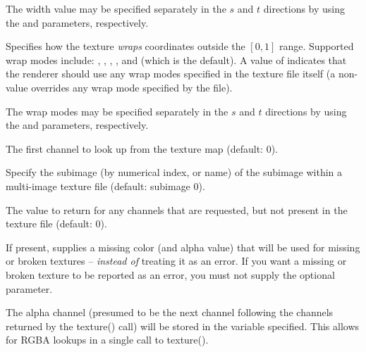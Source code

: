 \documentclass[11pt,letterpaper]{book}
\begin{document}
The width value may be specified separately in the $s$ and $t$
directions by using the  and  parameters,
respectively.
\apiend
\vspace{-16pt}

\vspace{12pt}

Specifies how the texture \emph{wraps} coordinates outside the $[0,1]$
range.  Supported wrap modes include: , ,
, , and  (which is the default).  A
value of  indicates that the renderer should use any wrap
modes specified in the texture file itself (a non- value
overrides any wrap mode specified by the file).

The wrap modes may be specified separately in the $s$ and $t$ directions
by using the  and  parameters, respectively.
\apiend
\vspace{-16pt}

\vspace{12pt}
The first channel to look up from the texture map (default: 0).
\apiend
\vspace{-16pt}

\vspace{12pt}
Specify the subimage (by numerical index, or name) of the subimage
within a multi-image texture file (default: subimage 0).
\apiend
\vspace{-16pt}

\vspace{12pt}
The value to return for any channels that are requested,
but not present in the texture file (default: 0).
\apiend
\vspace{-16pt}

\vspace{12pt}
If present, supplies a missing color (and alpha value) that will
be used for missing or broken textures -- \emph{instead of} treating
it as an error.  If you want a missing or broken texture to be reported
as an error, you must not supply the optional 
parameter.
\apiend
\vspace{-16pt}

\vspace{12pt}
The alpha channel (presumed to be the next channel following the
channels returned by the {\cf texture()} call) will be stored in the
variable specified.  This allows for RGBA lookups in a single call to
{\cf texture()}.
\apiend
\vspace{-16pt}
\end{document}
